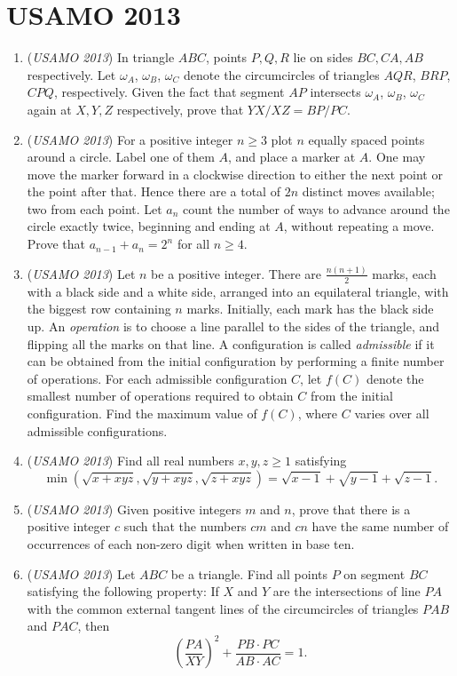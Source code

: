\section{USAMO 2013}
        \begin{enumerate}
        	\item (\textit{USAMO 2013}) In triangle $ABC$, points $P,Q,R$ lie on sides $BC,CA,AB$ respectively.  Let $\omega_A$, $\omega_B$, $\omega_C$ denote the circumcircles of triangles $AQR$, $BRP$, $CPQ$, respectively.  Given the fact that segment $AP$ intersects $\omega_A$, $\omega_B$, $\omega_C$ again at $X,Y,Z$ respectively, prove that $YX/XZ=BP/PC$.


 

	\item (\textit{USAMO 2013}) For a positive integer $n\geq 3$ plot $n$ equally spaced points around a circle.  Label one of them $A$, and place a marker at $A$.  One may move the marker forward in a clockwise direction to either the next point or the point after that.  Hence there are a total of $2n$ distinct moves available; two from each point.  Let $a_n$ count the number of ways to advance around the circle exactly twice, beginning and ending at $A$, without repeating a move.  Prove that $a_{n-1}+a_n=2^n$ for all $n\geq 4$.


 

	\item (\textit{USAMO 2013}) Let $n$ be a positive integer.  There are $\frac{n(n+1)}{2}$ marks, each with a black side and a white side, arranged into an equilateral triangle, with the biggest row containing $n$ marks.  Initially, each mark has the black side up.  An \textit{operation} is to choose a line parallel to the sides of the triangle, and flipping all the marks on that line.  A configuration is called \textit{admissible} if it can be obtained from the initial configuration by performing a finite number of operations.  For each admissible configuration $C$, let $f(C)$ denote the smallest number of operations required to obtain $C$ from the initial configuration.  Find the maximum value of $f(C)$, where $C$ varies over all admissible configurations.


 

	\item (\textit{USAMO 2013}) Find all real numbers $x,y,z\geq 1$ satisfying 
 \[\min(\sqrt{x+xyz},\sqrt{y+xyz},\sqrt{z+xyz})=\sqrt{x-1}+\sqrt{y-1}+\sqrt{z-1}.\]


	\item (\textit{USAMO 2013}) Given positive integers $m$ and $n$, prove that there is a positive integer $c$ such that the numbers $cm$ and $cn$ have the same number of occurrences of each non-zero digit when written in base ten.


 

	\item (\textit{USAMO 2013}) Let $ABC$ be a triangle.  Find all points $P$ on segment $BC$ satisfying the following property:  If $X$ and $Y$ are the intersections of line $PA$ with the common external tangent lines of the circumcircles of triangles $PAB$ and $PAC$, then 
 \[\left(\frac{PA}{XY}\right)^2+\frac{PB\cdot PC}{AB\cdot AC}=1.\]


\end{enumerate}